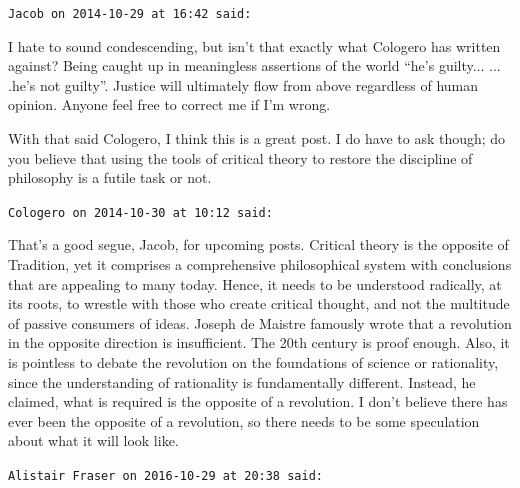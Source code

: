 \begin{footnotesize}
\begin{sffamily}

\texttt{Jacob on 2014-10-29 at 16:42 said:}

I hate to sound condescending, but isn't that exactly what Cologero has written against? Being caught up in meaningless assertions of the world ``he's guilty... ... .he's not guilty''. Justice will ultimately flow from above regardless of human opinion. Anyone feel free to correct me if I'm wrong.

With that said Cologero, I think this is a great post. I do have to ask though; do you believe that using the tools of critical theory to restore the discipline of philosophy is a futile task or not.

\hfill

\texttt{Cologero on 2014-10-30 at 10:12 said:}

That's a good segue, Jacob, for upcoming posts. Critical theory is the opposite of Tradition, yet it comprises a comprehensive philosophical system with conclusions that are appealing to many today. Hence, it needs to be understood radically, at its roots, to wrestle with those who create critical thought, and not the multitude of passive consumers of ideas. Joseph de Maistre famously wrote that a revolution in the opposite direction is insufficient. The 20th century is proof enough. Also, it is pointless to debate the revolution on the foundations of science or rationality, since the understanding of rationality is fundamentally different. Instead, he claimed, what is required is the opposite of a revolution. I don't believe there has ever been the opposite of a revolution, so there needs to be some speculation about what it will look like.

\hfill

\texttt{Alistair Fraser on 2016-10-29 at 20:38 said:}


\end{sffamily}
\end{footnotesize}
